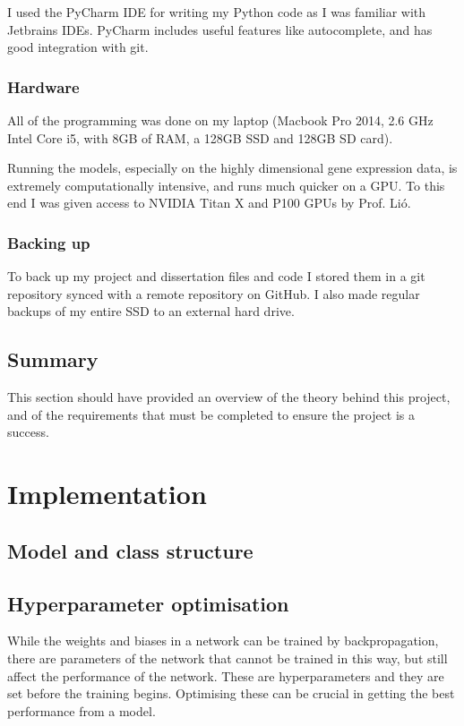 \documentclass[12pt,a4paper,twoside,openright]{report}
\begin{document}
I used the PyCharm IDE for writing my Python code as I was familiar with Jetbrains IDEs.
PyCharm includes useful features like autocomplete, and has good integration with git.

\subsection{Hardware}

All of the programming was done on my laptop (Macbook Pro 2014, 2.6 GHz Intel Core i5, with 8GB of RAM, a 128GB SSD and 128GB SD card).

Running the models, especially on the highly dimensional gene expression data, is extremely computationally intensive, and runs much 
quicker on a GPU. To this end I was given access to NVIDIA Titan X and P100 GPUs by Prof. Li\'o.

\subsection{Backing up}

To back up my project and dissertation files and code I stored them in a git repository synced with a remote repository on GitHub. I also 
made regular backups of my entire SSD to an external hard drive.

\section{Summary}

This section should have provided an overview of the theory behind this project, and of the requirements that must be completed to 
ensure the project is a success.

\chapter{Implementation}

\section{Model and class structure}

\section{Hyperparameter optimisation} \label{hyper}
While the weights and biases in a network can be trained by backpropagation, there are parameters of the network that cannot be trained in 
this way, but still affect the performance of the network. These are hyperparameters and they are set before the training begins. 
Optimising these can be crucial in getting the best performance from a model.
\end{document}
